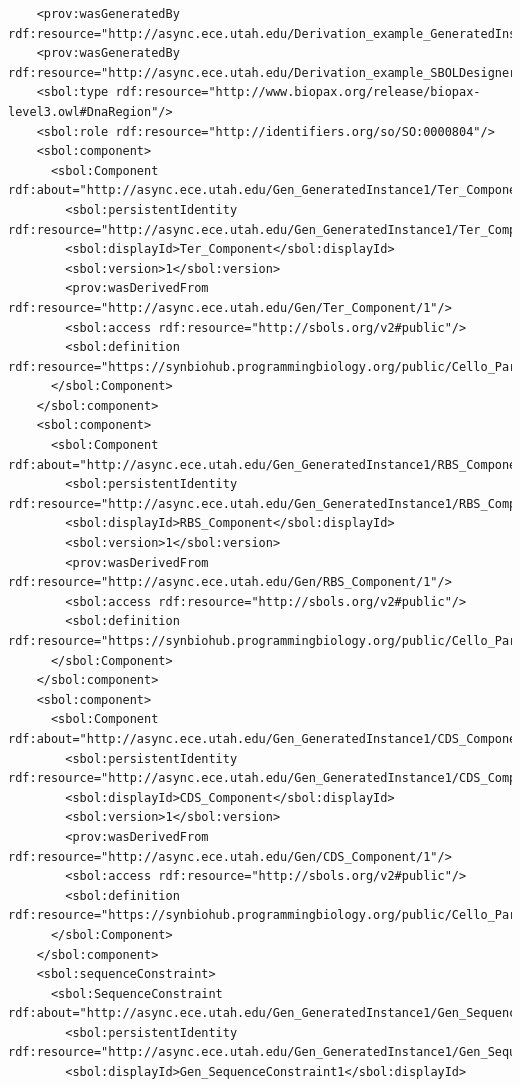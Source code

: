 \begin{lstlisting}
    <prov:wasGeneratedBy rdf:resource="http://async.ece.utah.edu/Derivation_example_GeneratedInstance21_SBOLDesignerActivity/1"/>
    <prov:wasGeneratedBy rdf:resource="http://async.ece.utah.edu/Derivation_example_SBOLDesignerActivity/1"/>
    <sbol:type rdf:resource="http://www.biopax.org/release/biopax-level3.owl#DnaRegion"/>
    <sbol:role rdf:resource="http://identifiers.org/so/SO:0000804"/>
    <sbol:component>
      <sbol:Component rdf:about="http://async.ece.utah.edu/Gen_GeneratedInstance1/Ter_Component/1">
        <sbol:persistentIdentity rdf:resource="http://async.ece.utah.edu/Gen_GeneratedInstance1/Ter_Component"/>
        <sbol:displayId>Ter_Component</sbol:displayId>
        <sbol:version>1</sbol:version>
        <prov:wasDerivedFrom rdf:resource="http://async.ece.utah.edu/Gen/Ter_Component/1"/>
        <sbol:access rdf:resource="http://sbols.org/v2#public"/>
        <sbol:definition rdf:resource="https://synbiohub.programmingbiology.org/public/Cello_Parts/L3S3P31/1"/>
      </sbol:Component>
    </sbol:component>
    <sbol:component>
      <sbol:Component rdf:about="http://async.ece.utah.edu/Gen_GeneratedInstance1/RBS_Component/1">
        <sbol:persistentIdentity rdf:resource="http://async.ece.utah.edu/Gen_GeneratedInstance1/RBS_Component"/>
        <sbol:displayId>RBS_Component</sbol:displayId>
        <sbol:version>1</sbol:version>
        <prov:wasDerivedFrom rdf:resource="http://async.ece.utah.edu/Gen/RBS_Component/1"/>
        <sbol:access rdf:resource="http://sbols.org/v2#public"/>
        <sbol:definition rdf:resource="https://synbiohub.programmingbiology.org/public/Cello_Parts/P1/1"/>
      </sbol:Component>
    </sbol:component>
    <sbol:component>
      <sbol:Component rdf:about="http://async.ece.utah.edu/Gen_GeneratedInstance1/CDS_Component/1">
        <sbol:persistentIdentity rdf:resource="http://async.ece.utah.edu/Gen_GeneratedInstance1/CDS_Component"/>
        <sbol:displayId>CDS_Component</sbol:displayId>
        <sbol:version>1</sbol:version>
        <prov:wasDerivedFrom rdf:resource="http://async.ece.utah.edu/Gen/CDS_Component/1"/>
        <sbol:access rdf:resource="http://sbols.org/v2#public"/>
        <sbol:definition rdf:resource="https://synbiohub.programmingbiology.org/public/Cello_Parts/PhlF/1"/>
      </sbol:Component>
    </sbol:component>
    <sbol:sequenceConstraint>
      <sbol:SequenceConstraint rdf:about="http://async.ece.utah.edu/Gen_GeneratedInstance1/Gen_SequenceConstraint1/1">
        <sbol:persistentIdentity rdf:resource="http://async.ece.utah.edu/Gen_GeneratedInstance1/Gen_SequenceConstraint1"/>
        <sbol:displayId>Gen_SequenceConstraint1</sbol:displayId>

\end{lstlisting}

